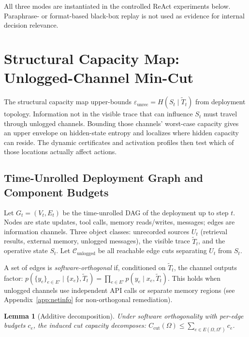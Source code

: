 \documentclass{article}
\newtheorem{lemma}{Lemma}
\begin{document}
  All three modes are instantiated in the controlled ReAct experiments below.
  Paraphrase- or format-based black-box replay is not used as evidence for
  internal decision relevance.

  \section{Structural Capacity Map: Unlogged-Channel Min-Cut}
  \label{sec:static-cert}

  The structural capacity map upper-bounds
  $\varepsilon_\text{unrec}=H(S_t\mid\tilde T_t)$ from deployment topology.
  Information not in the visible trace that can influence $S_t$ must travel
  through unlogged channels. Bounding those channels' worst-case capacity gives
  an upper envelope on hidden-state entropy and localizes where hidden capacity
  can reside. The dynamic certificates and activation profiles then test which
  of those locations actually affect actions.

  \subsection{Time-Unrolled Deployment Graph and Component Budgets}

  Let $G_t = (V_t, E_t)$ be the time-unrolled DAG of the deployment up to step
  $t$. Nodes are state updates, tool calls, memory reads/writes, messages; edges
   are information channels. Three object classes: unrecorded sources $U_t$
  (retrieval results, external memory, unlogged messages), the visible trace
  $\tilde T_t$, and the operative state $S_t$. Let $\mathcal{C}_\text{unlogged}$
   be all reachable edge cuts separating $U_t$ from $S_t$.

  A set of edges is \emph{software-orthogonal} if, conditioned on $\tilde T_t$,
  the channel outputs factor: $p(\{y_e\}_{e \in E'} \mid \{x_e\}, \tilde T_t) =
  \prod_{e \in E'} p(y_e \mid x_e, \tilde T_t)$. This holds when unlogged
  channels use independent API calls or separate memory regions (see
  Appendix~\ref{app:netinfo} for non-orthogonal remediation).

  \begin{lemma}[Additive decomposition]
  \label{lem:ortho-decomp}
  Under software orthogonality with per-edge budgets $c_e$, the induced cut
  capacity decomposes: $C_\text{cut}(\Omega) \leq \sum_{e \in E(\Omega,
  \Omega^c)} c_e$.
  \end{lemma}
\end{document}
